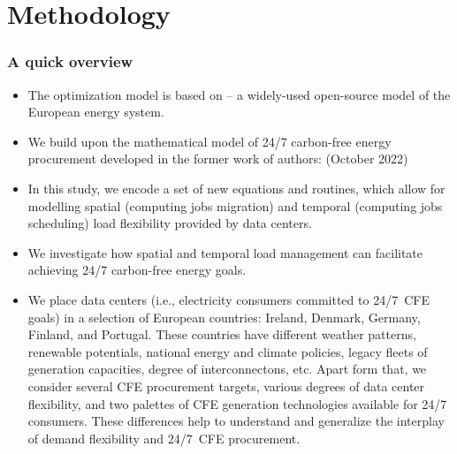 \section{Methodology}


\begin{frame}
  \frametitle{A quick overview}

{\footnotesize
  \begin{itemize}
    
    \item The optimization model is based on  -- a widely-used open-source model of the European energy system.

    \item We build upon the mathematical model of 24/7 carbon-free energy procurement developed in the former work of authors:  (October 2022)
    
    \item In this study, we encode a set of new equations and routines, which allow for modelling spatial (computing jobs migration) and temporal (computing jobs scheduling) load flexibility provided by data centers.

    \item We investigate how spatial and temporal load management can facilitate achieving 24/7 carbon-free energy goals.

    \item We place data centers (i.e., electricity consumers committed to 24/7~CFE goals) in a 
    selection of European countries: Ireland, Denmark, Germany, Finland, and Portugal. These countries have different weather patterns, renewable potentials, national energy and climate policies, legacy fleets of generation capacities, degree of interconnectons, etc. 
    Apart form that, we consider several CFE procurement targets, various degrees of data center flexibility, and two palettes of CFE generation technologies available for 24/7 consumers. These differences help to understand and generalize the interplay of demand flexibility and 24/7~CFE procurement.

  \end{itemize}
}

\end{frame}


